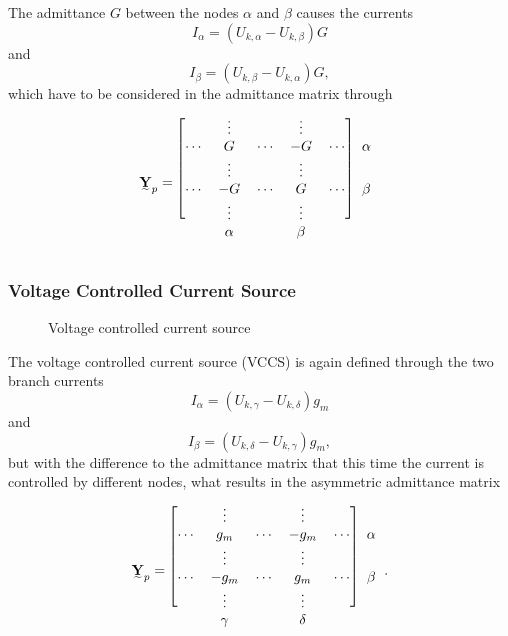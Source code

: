 The admittance $G$ between the nodes $\alpha$ and $\beta$  causes the currents
\begin{equation}
	I_\alpha = (U_{k,\alpha} - U_{k,\beta}) G
\end{equation}
and
\begin{equation}
	I_\beta = (U_{k,\beta} - U_{k,\alpha}) G,
\end{equation}
which have to be considered in the admittance matrix through
\begin{equation}
	\mat Y_p = 	
	\begin{blockarray}{cccccc}
		\begin{block}{[ccccc]c}
		 		& \vdots	&			& \vdots	&			& \\
		\cdots	& G			& \cdots	& -G		& \cdots	& \alpha \\
		 		& \vdots	&			& \vdots	&			& \\
		\cdots	& -G		& \cdots	& G			& \cdots	& \beta \\
		 		& \vdots	&			& \vdots	&			& \\
		\end{block}
				& \alpha	&			& \beta		&			& 
	\end{blockarray}
\end{equation}

\subsubsection{Voltage Controlled Current Source}

\begin{figure}
	\centering
	
	\caption{Voltage controlled current source}
	\label{fig:voltage_controlled_current_source}
\end{figure}

The voltage controlled current source (VCCS) is again defined through the two branch currents
\begin{equation}
	I_\alpha = (U_{k,\gamma} - U_{k,\delta}) g_m
\end{equation}
and
\begin{equation}
	I_\beta = (U_{k,\delta} - U_{k,\gamma}) g_m,
\end{equation}
but with the difference to the admittance matrix that this time the current is controlled by different nodes, what results in the asymmetric admittance matrix
\begin{equation}
	\mat Y_p = 	
	\begin{blockarray}{cccccc}
		\begin{block}{[ccccc]c}
		 		& \vdots	&			& \vdots	&			& \\
		\cdots	& g_m		& \cdots	& -g_m		& \cdots	& \alpha \\
		 		& \vdots	&			& \vdots	&			& \\
		\cdots	& -g_m		& \cdots	& g_m		& \cdots	& \beta \\
		 		& \vdots	&			& \vdots	&			& \\
		\end{block}
				& \gamma	&			& \delta	&			& 
	\end{blockarray}.
\end{equation}

